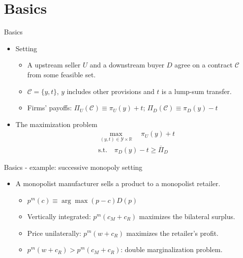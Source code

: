 \documentclass[aspectratio=169]{beamer}  %
\begin{document}
\section{Basics}
\begin{frame}{Basics}
    \begin{itemize}
        \item Setting \vspace{.2cm}
        \begin{itemize}
            \item A upstream seller $U$ and a downstream buyer $D$ agree on a contract $\mathcal{C}$ from some feasible set. \vspace{.2cm}
            \item $\mathcal{C} = \{y, t\}$, $y$ includes other provisions and $t$ is a lump-sum transfer. \vspace{.2cm}
            \item Firms' payoffs: $\Pi_U(\mathcal{C})\equiv \pi_U(y) + t$; $\Pi_D(\mathcal{C})\equiv \pi_D(y) - t$ \vspace{.2cm}
        \end{itemize}
        \item The maximization problem \vspace{.2cm}
        \begin{equation}
            \begin{aligned}
            & \max_{(y, t) \in \mathcal{Y} \times \mathbb{R}} \quad \pi_U(y) + t \\
            & \text{s.t.} \quad \pi_D(y) - t \geq \overline{\Pi}_D
            \end{aligned}
            \end{equation}
    \end{itemize}
\end{frame}



\begin{frame}{Basics - example: successive monopoly setting}
    \begin{itemize}
        \item A monopolist manufacturer sells a product to a monopolist retailer. \vspace{.2cm}
        \begin{itemize}
            \item $p^m(c)\equiv \arg\max (p-c)D(p)$ \vspace{.2cm}
            \item Vertically integrated: $p^m(c_M+c_R)$ maximizes the bilateral surplus. \vspace{.2cm}
            \item Price unilaterally: $p^m(w+c_R)$ maximizes the retailer's profit. \vspace{.2cm}
            \item $p^m(w+c_R) > p^m(c_M+c_R)$: double marginalization problem. \vspace{.2cm} 
        \end{itemize} 
    \end{itemize}
\end{frame}
\end{document}

